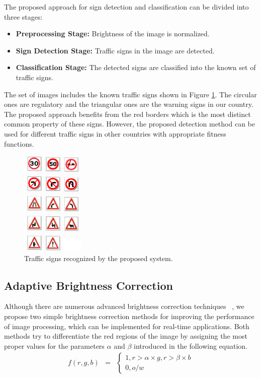 \documentclass[review,number]{elsarticle}
\begin{document}
The proposed approach for sign detection and classification can be divided into three stages:
\begin{itemize}
	\item \textbf{Preprocessing Stage:} Brightness of the image is normalized.
	\item \textbf{Sign Detection Stage:} Traffic signs in the image are detected.
	\item \textbf{Classification Stage:} The detected signs are classified into the known set of traffic signs. 
\end{itemize}


The set of images includes the known traffic signs shown in Figure \ref{fig:signs}. The circular ones are regulatory and the triangular ones are the warning signs in our country. The proposed approach benefits from the red borders which is the most distinct common property of these signs. However, the proposed detection method can be used for different traffic signs in other countries with appropriate fitness functions.

\begin{figure}[ht]
\begin{center}
\includegraphics[width=30mm,height=50mm]{img/signs.eps}
\caption{Traffic signs recognized by the proposed system.}
\label{fig:signs}
\end{center}
\end{figure}
\par

\subsection{Adaptive Brightness Correction}
Although there are numerous advanced brightness correction techniques ~\cite{chen03, yang08}, we propose two simple brightness correction methods for improving the performance of image processing, which can be implemented for real-time applications. Both methods try to differentiate the red regions of the image by assigning the most proper values for the parameters $\alpha$ and $\beta$ introduced in the following equation.
\begin{eqnarray}
\label{eq1}
f(r,g,b)&=& \left\{\begin{array}{l} 1, r>\alpha \times g, r>\beta \times b \\ 0, o/w \end{array} \right.
\end{eqnarray}
\end{document}
